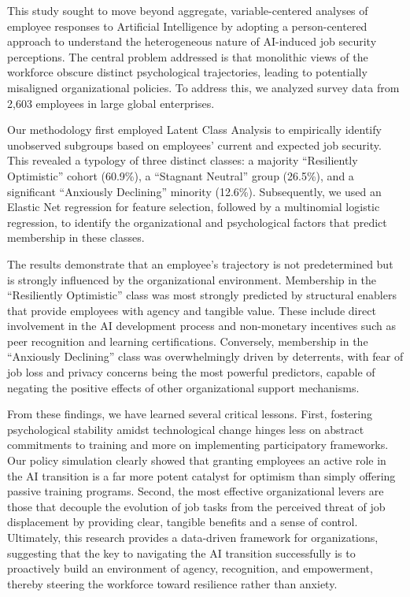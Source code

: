 \documentclass[]{article}
\begin{document}
This study sought to move beyond aggregate, variable-centered analyses of employee responses to Artificial Intelligence by adopting a person-centered approach to understand the heterogeneous nature of AI-induced job security perceptions. The central problem addressed is that monolithic views of the workforce obscure distinct psychological trajectories, leading to potentially misaligned organizational policies. To address this, we analyzed survey data from 2,603 employees in large global enterprises.

Our methodology first employed Latent Class Analysis to empirically identify unobserved subgroups based on employees' current and expected job security. This revealed a typology of three distinct classes: a majority ``Resiliently Optimistic'' cohort (60.9\%), a ``Stagnant Neutral'' group (26.5\%), and a significant ``Anxiously Declining'' minority (12.6\%). Subsequently, we used an Elastic Net regression for feature selection, followed by a multinomial logistic regression, to identify the organizational and psychological factors that predict membership in these classes.

The results demonstrate that an employee's trajectory is not predetermined but is strongly influenced by the organizational environment. Membership in the ``Resiliently Optimistic'' class was most strongly predicted by structural enablers that provide employees with agency and tangible value. These include direct involvement in the AI development process and non-monetary incentives such as peer recognition and learning certifications. Conversely, membership in the ``Anxiously Declining'' class was overwhelmingly driven by deterrents, with fear of job loss and privacy concerns being the most powerful predictors, capable of negating the positive effects of other organizational support mechanisms.

From these findings, we have learned several critical lessons. First, fostering psychological stability amidst technological change hinges less on abstract commitments to training and more on implementing participatory frameworks. Our policy simulation clearly showed that granting employees an active role in the AI transition is a far more potent catalyst for optimism than simply offering passive training programs. Second, the most effective organizational levers are those that decouple the evolution of job tasks from the perceived threat of job displacement by providing clear, tangible benefits and a sense of control. Ultimately, this research provides a data-driven framework for organizations, suggesting that the key to navigating the AI transition successfully is to proactively build an environment of agency, recognition, and empowerment, thereby steering the workforce toward resilience rather than anxiety.
\end{document}
